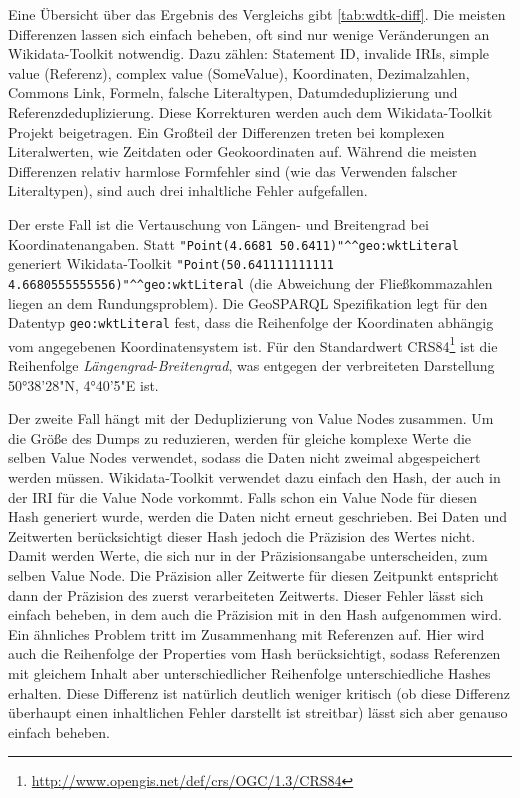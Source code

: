 Eine Übersicht über das Ergebnis des Vergleichs gibt \cref{tab:wdtk-diff}.
Die meisten Differenzen lassen sich einfach beheben, oft sind nur wenige Veränderungen an Wikidata-Toolkit notwendig. Dazu zählen: Statement ID, invalide IRIs, simple value (Referenz), complex value (SomeValue), Koordinaten, Dezimalzahlen, Commons Link, Formeln, falsche Literaltypen, Datumdeduplizierung und Referenzdeduplizierung.
Diese Korrekturen werden auch dem Wikidata-Toolkit Projekt beigetragen.
Ein Großteil der Differenzen treten bei komplexen Literalwerten, wie Zeitdaten oder Geokoordinaten auf.
Während die meisten Differenzen relativ harmlose Formfehler sind (wie das Verwenden falscher Literaltypen), sind auch drei inhaltliche Fehler aufgefallen.

Der erste Fall ist die Vertauschung von Längen- und Breitengrad bei Koordinatenangaben.
Statt \verb|"Point(4.6681 50.6411)"^^geo:wktLiteral| generiert Wikidata-Toolkit \verb|"Point(50.641111111111 4.6680555555556)"^^geo:wktLiteral| (die Abweichung der Fließkommazahlen liegen an dem Rundungsproblem). Die GeoSPARQL Spezifikation\cite{spec:geosparql} legt für den Datentyp \verb|geo:wktLiteral| fest, dass die Reihenfolge der Koordinaten abhängig vom angegebenen Koordinatensystem ist.
Für den Standardwert CRS84\footnote{\url{http://www.opengis.net/def/crs/OGC/1.3/CRS84}} ist die Reihenfolge \emph{Längengrad}-\emph{Breitengrad}, was entgegen der verbreiteten Darstellung 50°38'28"N, 4°40'5"E ist.

Der zweite Fall hängt mit der Deduplizierung von Value Nodes zusammen.
Um die Größe des Dumps zu reduzieren, werden für gleiche komplexe Werte die selben Value Nodes verwendet, sodass die Daten nicht zweimal abgespeichert werden müssen.
Wikidata-Toolkit verwendet dazu einfach den Hash, der auch in der IRI für die Value Node vorkommt.
Falls schon ein Value Node für diesen Hash generiert wurde, werden die Daten nicht erneut geschrieben.
Bei Daten und Zeitwerten berücksichtigt dieser Hash jedoch die Präzision des Wertes nicht.
Damit werden Werte, die sich nur in der Präzisionsangabe unterscheiden, zum selben Value Node.
Die Präzision aller Zeitwerte für diesen Zeitpunkt entspricht dann der Präzision des zuerst verarbeiteten Zeitwerts.
Dieser Fehler lässt sich einfach beheben, in dem auch die Präzision mit in den Hash aufgenommen wird.
Ein ähnliches Problem tritt im Zusammenhang mit Referenzen auf.
Hier wird auch die Reihenfolge der Properties vom Hash berücksichtigt, sodass Referenzen mit gleichem Inhalt aber unterschiedlicher Reihenfolge unterschiedliche Hashes erhalten.
Diese Differenz ist natürlich deutlich weniger kritisch (ob diese Differenz überhaupt einen inhaltlichen Fehler darstellt ist streitbar) lässt sich aber genauso einfach beheben.

